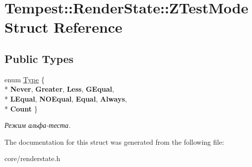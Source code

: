 \hypertarget{struct_tempest_1_1_render_state_1_1_z_test_mode}{\section{Tempest\+:\+:Render\+State\+:\+:Z\+Test\+Mode Struct Reference}
\label{struct_tempest_1_1_render_state_1_1_z_test_mode}
}
\subsection*{Public Types}
\begin{DoxyCompactItemize}
\item 
\hypertarget{struct_tempest_1_1_render_state_1_1_z_test_mode_a4c9cda74fdb9d721ea80eba27acd178c}{enum \hyperlink{struct_tempest_1_1_render_state_1_1_z_test_mode_a4c9cda74fdb9d721ea80eba27acd178c}{Type} \{ \\*
{\bfseries Never}, 
{\bfseries Greater}, 
{\bfseries Less}, 
{\bfseries G\+Equal}, 
\\*
{\bfseries L\+Equal}, 
{\bfseries N\+O\+Equal}, 
{\bfseries Equal}, 
{\bfseries Always}, 
\\*
{\bfseries Count}
 \}}\label{struct_tempest_1_1_render_state_1_1_z_test_mode_a4c9cda74fdb9d721ea80eba27acd178c}

\begin{DoxyCompactList}\small\item\em Режим альфа-\/теста. \end{DoxyCompactList}\end{DoxyCompactItemize}


The documentation for this struct was generated from the following file\+:\begin{DoxyCompactItemize}
\item 
core/renderstate.\+h\end{DoxyCompactItemize}
